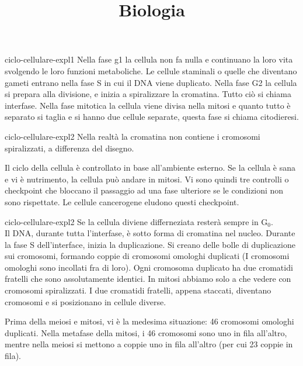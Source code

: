 \documentclass[preview]{standalone}
\begin{document}
\title{Biologia}
\genpage


\begin{snippet}{ciclo-cellulare-expl1}
    Nella fase g1 la cellula non fa nulla e continuano la loro vita svolgendo le loro funzioni metaboliche. 
    Le cellule staminali o quelle che diventano gameti entrano nella fase S in cui il DNA viene duplicato. 
    Nella fase G2 la cellula si prepara alla divisione, e inizia a spiralizzare la cromatina. 
    Tutto ciò si chiama interfase.
    Nella fase mitotica la cellula viene divisa nella mitosi e quanto tutto è separato si taglia e si hanno due cellule separate, questa fase si chiama citodieresi.
\end{snippet}


\begin{snippet}{ciclo-cellulare-expl2}
    Nella realtà la cromatina non contiene i cromosomi spiralizzati, a differenza del disegno.

    Il ciclo della cellula è controllato in base all'ambiente esterno.
    Se la cellula è sana e vi è nutrimento, la cellula può andare in mitosi.
    Vi sono quindi tre controlli o checkpoint che bloccano il passaggio ad una fase ulteriore
    se le condizioni non sono rispettate.
    Le cellule cancerogene eludono questi checkpoint.
\end{snippet}


\begin{snippet}{ciclo-cellulare-expl2}
    Se la cellula diviene differneziata resterà sempre in G\({}_0\).
    \\
    Il DNA, durante tutta l'interfase, è sotto forma di cromatina nel nucleo.
    Durante la fase S dell'interface, inizia la duplicazione.
    Si creano delle bolle di duplicazione sui cromosomi, formando
    coppie di cromosomi omologhi duplicati (I cromosomi omologhi sono incollati fra di loro).
    Ogni cromosoma duplicato ha due cromatidi fratelli che sono assolutamente identici.
    In mitosi abbiamo solo a che vedere con cromosomi spiralizzati.
    I due cromatidi fratelli, appena staccati, diventano cromosomi e si posizionano in cellule diverse.

    Prima della meiosi e mitosi, vi è la medesima situazione: 46 cromosomi omologhi duplicati.
    Nella metafase della mitosi, i 46 cromosomi sono uno in fila all'altro,
    mentre nella meiosi si mettono a coppie uno in fila all'altro (per cui 23 coppie in fila).
\end{snippet}
\end{document}
